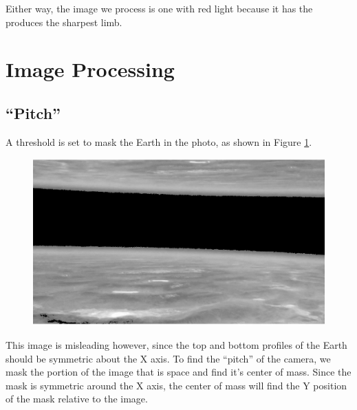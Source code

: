 \documentclass[10pt]{article}
\begin{document}
Either way, the image we process is one with red light because it has the produces the sharpest limb.

\newpage

\section{Image Processing} %
\label{sec:image_processing}

\subsection{``Pitch''} %
\label{sub:pitch}

A threshold is set to mask the Earth in the photo, as shown in Figure \ref{rmask}.

\begin{figure}[!h]
    \centering
    \includegraphics[width=.9\textwidth]{plots_tables_images/rmask.eps}
    \label{rmask}
\end{figure}

This image is misleading however, since the top and bottom profiles of the Earth should be symmetric about the X axis. To find the ``pitch'' of the camera, we mask the portion of the image that is space and find it's center of mass. Since the mask is symmetric around the X axis, the center of mass will find the Y position of the mask relative to the image. 
\end{document}
